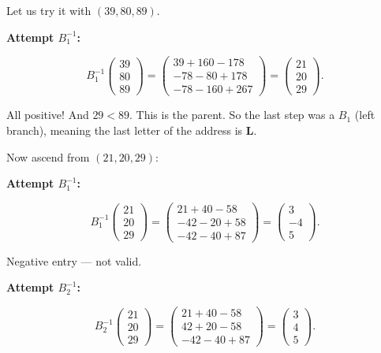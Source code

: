 Let us try it with $(39, 80, 89)$.

\textbf{Attempt $B_1^{-1}$:}

\[B_1^{-1} \begin{pmatrix} 39 \\ 80 \\ 89 \end{pmatrix} = \begin{pmatrix} 39 + 160 - 178 \\ -78 - 80 + 178 \\ -78 - 160 + 267 \end{pmatrix} = \begin{pmatrix} 21 \\ 20 \\ 29 \end{pmatrix}.\]

All positive! And $29 < 89$. This is the parent. So the last step was a $B_1$ (left branch), meaning the last letter of the address is \textbf{L}.

Now ascend from $(21, 20, 29)$:

\textbf{Attempt $B_1^{-1}$:}

\[B_1^{-1} \begin{pmatrix} 21 \\ 20 \\ 29 \end{pmatrix} = \begin{pmatrix} 21 + 40 - 58 \\ -42 - 20 + 58 \\ -42 - 40 + 87 \end{pmatrix} = \begin{pmatrix} 3 \\ -4 \\ 5 \end{pmatrix}.\]

Negative entry --- not valid.

\textbf{Attempt $B_2^{-1}$:}

\[B_2^{-1} \begin{pmatrix} 21 \\ 20 \\ 29 \end{pmatrix} = \begin{pmatrix} 21 + 40 - 58 \\ 42 + 20 - 58 \\ -42 - 40 + 87 \end{pmatrix} = \begin{pmatrix} 3 \\ 4 \\ 5 \end{pmatrix}.\]

